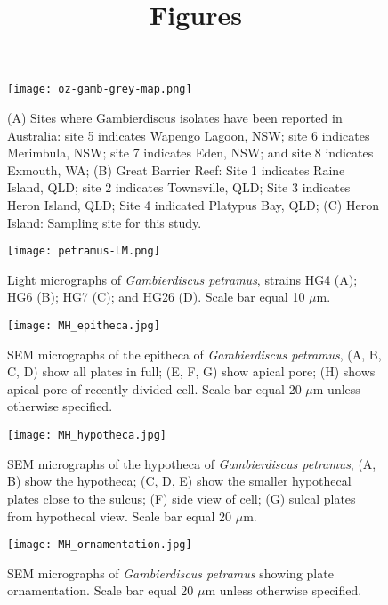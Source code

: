 \documentclass[12pt]{article}
\title{Figures}
\begin{document}
\begin{figure} 
\texttt{[image: oz-gamb-grey-map.png]} 
\caption{(A) Sites where Gambierdiscus isolates have been reported in Australia: site 5 indicates Wapengo Lagoon, NSW; site 6 indicates Merimbula, NSW; site 7 indicates Eden, NSW; and site 8 indicates Exmouth, WA; (B) Great Barrier Reef:​ Site 1 indicates Raine Island, QLD; site 2 indicates Townsville, QLD; Site 3 indicates Heron Island, QLD; Site 4 indicated Platypus Bay, QLD; (C) Heron Island: Sampling site for this study.} 
\label{fig:OzSites}
\end{figure} 

\begin{figure} 
\texttt{[image: petramus-LM.png]} 
\caption{Light micrographs of \emph{Gambierdiscus petramus}, strains HG4 (A); HG6 (B); HG7 (C); and HG26 (D). Scale bar equal 10 $\mu$m.​} 
\label{fig:PetLM}
\end{figure} 

\FloatBarrier 
\begin{figure} 
\texttt{[image: MH\_epitheca.jpg]} 
\caption{SEM micrographs of the epitheca of \emph{Gambierdiscus petramus}, (A, B, C, D) show all plates in full; (E, F, G) show apical pore; (H) shows apical pore of recently divided cell. Scale bar equal 20 $\mu$m unless otherwise specified.} 
\label{fig:epiSEM}
\end{figure} 
\FloatBarrier 

\FloatBarrier 
\begin{figure} 
\texttt{[image: MH\_hypotheca.jpg]} 
\caption{SEM micrographs of the hypotheca of \emph{Gambierdiscus petramus}, (A, B) show the hypotheca; (C, D, E) show the smaller hypothecal plates close to the sulcus; (F) side view of cell; (G) sulcal plates from hypothecal view. Scale bar equal 20 $\mu$m.} 
\label{fig:hypoSEM}
\end{figure} 
\FloatBarrier

\FloatBarrier 
\begin{figure} 
\texttt{[image: MH\_ornamentation.jpg]} 
\caption{SEM micrographs of \emph{Gambierdiscus petramus} showing plate ornamentation. Scale bar equal 20 $\mu$m unless otherwise specified.} 
\label{fig:ornSEM}
\end{figure} 
\FloatBarrier
\end{document}
